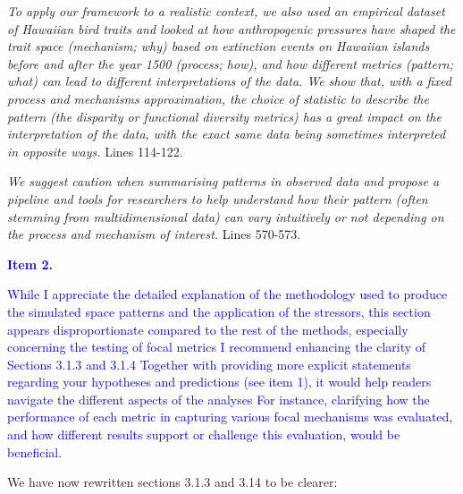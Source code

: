 \documentclass[
]{article}
\begin{document}
\textit{To apply our framework to a realistic context, we also used an empirical dataset of Hawaiian bird traits and looked at how anthropogenic pressures have shaped the trait space (mechanism; why) based on extinction events on Hawaiian islands before and after the year 1500 (process; how), and how different metrics (pattern; what) can lead to different interpretations of the data.
We show that, with a fixed process and mechanisms approximation, the choice of statistic to describe the pattern (the disparity or functional diversity metrics) has a great impact on the interpretation of the data, with the exact same data being sometimes interpreted in opposite ways.}
Lines 114-122.


\textit{We suggest caution when summarising patterns in observed data and propose a pipeline and tools for researchers to help understand how their pattern (often stemming from multidimensional data) can vary intuitively or not depending on the process and mechanism of interest.}
Lines 570-573.

\textcolor{blue}{\textbf{Item 2.}}

\textcolor{blue}{While I appreciate the detailed explanation of the methodology used to produce the simulated space patterns and the application of the stressors, this section appears disproportionate compared to the rest of the methods, especially concerning the testing of focal metrics
I recommend enhancing the clarity of Sections 3.1.3 and 3.1.4
Together with providing more explicit statements regarding your hypotheses and predictions (see item 1), it would help readers navigate the different aspects of the analyses
For instance, clarifying how the performance of each metric in capturing various focal mechanisms was evaluated, and how different results support or challenge this evaluation, would be beneficial.}

We have now rewritten sections 3.1.3 and 3.14 to be clearer:
\end{document}
